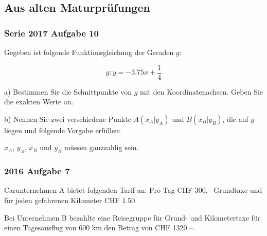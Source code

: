 \subsection{Aus alten Maturprüfungen}

\subsubsection{Serie 2017 Aufgabe 10}

Gegeben ist folgende Funktionsgleichung der Geraden $g$:

$$g: y = -3.75x + \frac{1}{4}$$

a) Bestimmen Sie die Schnittpunkte von $g$ mit den Koordinatenachsen.
Geben Sie die exakten Werte an.

\newpage

b) Nennen Sie zwei verschiedene Punkte $A(x_A | y_A)$ und $B(x_B | y_B)$, die
auf $g$ liegen und folgende Vorgabe erfüllen:

$x_A$, $y_A$, $x_B$ und $y_B$ müssen ganzzahlig sein. 

\newpage



\subsubsection{2016 Aufgabe 7}

Carunternehmen A bietet folgenden Tarif an:
Pro Tag CHF 300.-- Grundtaxe und für jeden gefahrenen Kilometer CHF 1.50.

Bei Unternehmen B bezahlte eine Reisegruppe für Grund- und Kilometertaxe für einen
Tagesausflug von 600 km den Betrag von CHF 1320.--.

